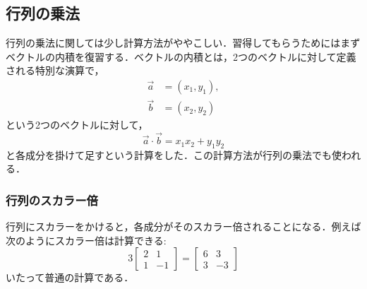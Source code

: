\documentclass[a4paper,12pt,autodetect-engine,dvipdfmx]{jsarticle}
\theoremstyle{definition}
\begin{document}
\subsection{行列の乗法}
行列の乗法に関しては少し計算方法がややこしい．習得してもらうためにはまずベクトルの内積を復習する．ベクトルの内積とは，2つのベクトルに対して定義される特別な演算で，
\begin{align*}
    \vec{a} &= (x_{1}, y_{1}),\\
    \vec{b} &= (x_{2}, y_{2})
\end{align*}
という2つのベクトルに対して，
\begin{equation*}
    \vec{a} \cdot \vec{b} = x_{1}x_{2} + y_{1}y_{2}
\end{equation*}
と各成分を掛けて足すという計算をした．この計算方法が行列の乗法でも使われる．
\subsubsection{行列のスカラー倍}
行列にスカラーをかけると，各成分がそのスカラー倍されることになる．例えば次のようにスカラー倍は計算できる:
\begin{equation*}
    3
    \begin{bmatrix}
        2 & 1\\
        1 & -1
    \end{bmatrix}
    = 
    \begin{bmatrix}
        6 & 3\\
        3 & -3
    \end{bmatrix}
\end{equation*}
いたって普通の計算である．
\end{document}
